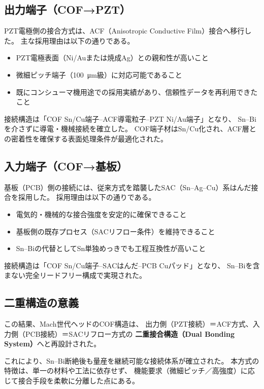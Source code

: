\documentclass[conference]{IEEEtran}
\begin{document}
\subsection{出力端子（COF→PZT）}
PZT電極側の接合方式は、ACF（Anisotropic Conductive Film）接合へ移行した。  
主な採用理由は以下の通りである。

\begin{itemize}
  \item PZT電極表面（Ni/Auまたは焼成Ag）との親和性が高いこと  
  \item 微細ピッチ端子（\SI{100}{\micro m}級）に対応可能であること  
  \item 既にコンシューマ機用途での採用実績があり、信頼性データを再利用できたこと
\end{itemize}

接続構造は「COF Sn/Cu端子–ACF導電粒子–PZT Ni/Au端子」となり、  
Sn–Biを介さずに導電・機械接続を確立した。  
COF端子材はSn/Cu化され、ACF層との密着性を確保する表面処理条件が最適化された。

\subsection{入力端子（COF→基板）}
基板（PCB）側の接続には、従来方式を踏襲したSAC（Sn–Ag–Cu）系はんだ接合を採用した。  
採用理由は以下の通りである。

\begin{itemize}
  \item 電気的・機械的な接合強度を安定的に確保できること  
  \item 基板側の既存プロセス（SACリフロー条件）を維持できること  
  \item Sn–Biの代替としてSn単独めっきでも工程互換性が高いこと
\end{itemize}

接続構造は「COF Sn/Cu端子–SACはんだ–PCB Cuパッド」となり、  
Sn–Biを含まない完全リードフリー構成で実現された。

\subsection{二重構造の意義}
この結果、Mach世代ヘッドのCOF構造は、  
出力側（PZT接続）＝ACF方式、入力側（PCB接続）＝SACリフロー方式の  
\textbf{二重接合構造（Dual Bonding System）}へと再設計された。  

これにより、Sn–Bi断絶後も量産を継続可能な接続体系が確立された。  
本方式の特徴は、単一の材料や工法に依存せず、  
機能要求（微細ピッチ／高強度）に応じて接合手段を柔軟に分離した点にある。  
\end{document}
